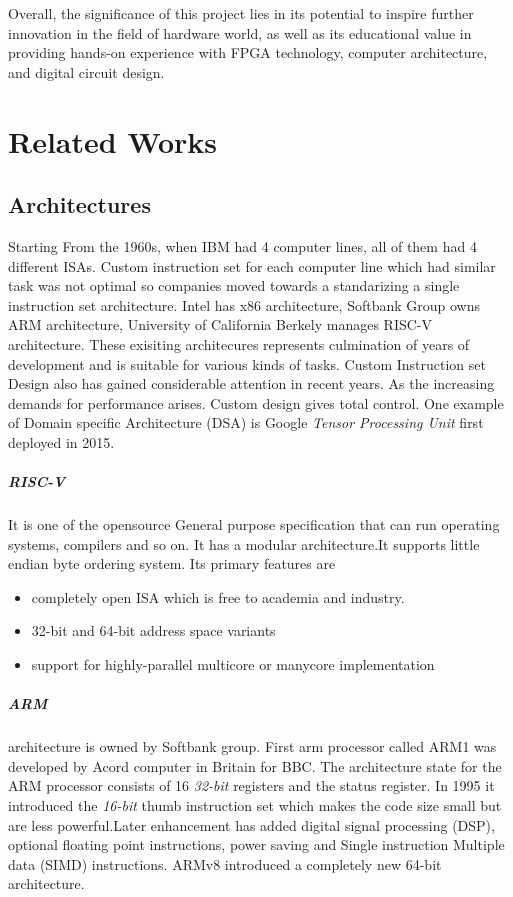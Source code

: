 \documentclass[a4paper,12pt]{article}
\begin{document}
    Overall, the significance of this project lies in its potential to inspire further innovation in the field of hardware world, as well as its educational value in providing hands-on experience with FPGA technology, computer architecture, and digital circuit design.
    \newpage
    \section{Related Works}
    \subsection{Architectures}
    Starting From the 1960s, when IBM had 4 computer lines, all of them had 4 different ISAs. Custom instruction set for each computer line which had similar task was not optimal so companies moved towards a standarizing a single instruction set architecture. Intel has x86 architecture, Softbank Group owns ARM architecture, University of California Berkely manages RISC-V architecture. These exisiting architecures represents culmination of years of development and is suitable for various kinds of tasks.
    Custom Instruction set Design also has gained considerable attention in recent years. As the increasing demands for performance arises. Custom design gives total control. One example of Domain specific Architecture (DSA) is Google \textit{ Tensor Processing Unit} first deployed in 2015. 
    \subparagraph{RISC-V}
    It is one of the opensource General purpose specification that can run operating systems, compilers and so on. It has a modular architecture.It supports little endian byte ordering system. Its primary features are
    \begin{itemize}
        \item  completely open ISA which is free to academia and industry.
        \item 32-bit and 64-bit address space variants
        \item support for highly-parallel multicore or manycore implementation
    \end{itemize}
    \subparagraph{ARM}
     architecture is owned by Softbank group. First arm processor called ARM1 was developed by Acord computer in Britain for BBC. The architecture state for the ARM processor consists of 16 \textit{32-bit} registers and the status register. In 1995 it introduced the \textit{16-bit} thumb instruction set which makes the code size small but are less powerful.Later enhancement has added digital signal processing (DSP), optional floating point instructions, power saving and Single instruction Multiple data (SIMD) instructions. ARMv8 introduced a completely new 64-bit architecture. 
\end{document}
